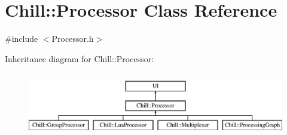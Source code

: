 \hypertarget{class_chill_1_1_processor}{}\section{Chill\+:\+:Processor Class Reference}
\label{class_chill_1_1_processor}


{\ttfamily \#include $<$Processor.\+h$>$}

Inheritance diagram for Chill\+:\+:Processor\+:\begin{figure}[H]
\begin{center}
\leavevmode
\includegraphics[height=2.818792cm]{class_chill_1_1_processor}
\end{center}
\end{figure}
